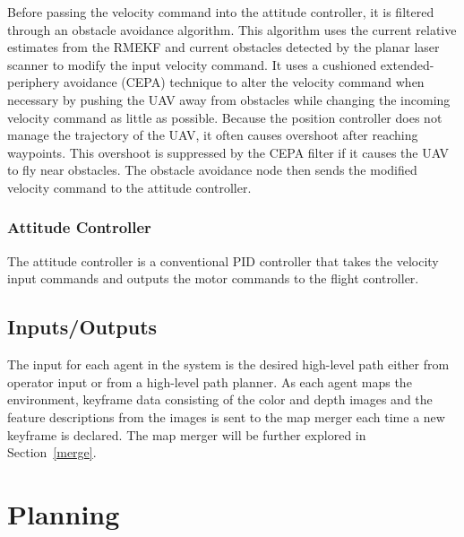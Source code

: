 \documentclass[letterpaper, 10 pt, conference]{ieeeconf}  %
\begin{document}
Before passing the velocity command into the attitude controller, it is filtered through an obstacle avoidance algorithm. This algorithm uses the current relative estimates from the RMEKF and current obstacles detected by the planar laser scanner to modify the input velocity command. It uses a cushioned extended-periphery avoidance (CEPA) technique \cite{Jackson2016} to alter the velocity command when necessary by pushing the UAV away from obstacles while changing the incoming velocity command as little as possible. Because the position controller does not manage the trajectory of the UAV, it often causes overshoot after reaching waypoints. This overshoot is suppressed by the CEPA filter if it causes the UAV to fly near obstacles. The obstacle avoidance node then sends the modified velocity command to the attitude controller.

\subsubsection{Attitude Controller}

The attitude controller is a conventional PID controller that takes the velocity input commands and outputs the motor commands to the flight controller.

\subsection{Inputs/Outputs}

The input for each agent in the system is the desired high-level path either from operator input or from a high-level path planner. As each agent maps the environment, keyframe data consisting of the color and depth images and the  feature descriptions from the images is sent to the map merger each time a new keyframe is declared. The map merger will be further explored in Section~\ref{merge}.

\section{Planning}\label{planning}
\end{document}
